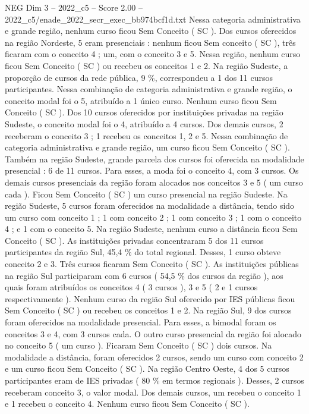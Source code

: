 \begin{textsample}{NEG Dim 3 – 2022\_c5 – Score 2.00 – 2022\_c5/enade\_2022\_secr\_exec\_bb974bcf1d.txt}
Nessa categoria administrativa e grande região, nenhum curso ficou Sem Conceito ( SC ).
Dos cursos oferecidos na região Nordeste, 5 eram presenciais : nenhum ficou Sem conceito ( SC ), três ficaram com o conceito 4 ; um, com o conceito 3 e 5.
Nessa região, nenhum curso ficou Sem Conceito ( SC ) ou recebeu os conceitos 1 e 2.
Na região Sudeste, a proporção de cursos da rede pública, 9 \%, correspondeu a 1 dos 11 cursos participantes.
Nessa combinação de categoria administrativa e grande região, o conceito modal foi o 5, atribuído a 1 único curso.
Nenhum curso ficou Sem Conceito ( SC ).
Dos 10 cursos oferecidos por instituições privadas na região Sudeste, o conceito modal foi o 4, atribuído a 4 cursos.
Dos demais cursos, 2 receberam o conceito 3 ; 1 recebeu os conceitos 1, 2 e 5.
Nessa combinação de categoria administrativa e grande região, um curso ficou Sem Conceito ( SC ).
Também na região Sudeste, grande parcela dos cursos foi oferecida na modalidade presencial : 6 de 11 cursos.
Para esses, a moda foi o conceito 4, com 3 cursos.
Os demais cursos presenciais da região foram alocados nos conceitos 3 e 5 ( um curso cada ).
Ficou Sem Conceito ( SC ) um curso presencial na região Sudeste.
Na região Sudeste, 5 cursos foram oferecidos na modalidade a distância, tendo sido um curso com conceito 1 ; 1 com conceito 2 ; 1 com conceito 3 ; 1 com o conceito 4 ; e 1 com o conceito 5.
Na região Sudeste, nenhum curso a distância ficou Sem Conceito ( SC ).
As instituições privadas concentraram 5 dos 11 cursos participantes da região Sul, 45,4 \% do total regional.
Desses, 1 curso obteve conceito 2 e 3.
Três cursos ficaram Sem Conceito ( SC ).
As instituições públicas na região Sul participaram com 6 cursos ( 54,5 \% dos cursos da região ), aos quais foram atribuídos os conceitos 4 ( 3 cursos ), 3 e 5 ( 2 e 1 cursos respectivamente ).
Nenhum curso da região Sul oferecido por IES públicas ficou Sem Conceito ( SC ) ou recebeu os conceitos 1 e 2.
Na região Sul, 9 dos cursos foram oferecidos na modalidade presencial.
Para esses, a bimodal foram os conceitos 3 e 4, com 3 cursos cada.
O outro curso presencial da região foi alocado no conceito 5 ( um curso ).
Ficaram Sem Conceito ( SC ) dois cursos.
Na modalidade a distância, foram oferecidos 2 cursos, sendo um curso com conceito 2 e um curso ficou Sem Conceito ( SC ).
Na região Centro Oeste, 4 dos 5 cursos participantes eram de IES privadas ( 80 \% em termos regionais ).
Desses, 2 cursos receberam conceito 3, o valor modal.
Dos demais cursos, um recebeu o conceito 1 e 1 recebeu o conceito 4.
Nenhum curso ficou Sem Conceito ( SC ).

\end{textsample}
